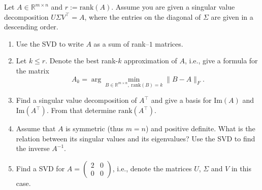  Let $A \in \mathbb{R}^{m \times n}$ and $r:=\text{rank}(A)$. Assume you are given a singular value decomposition 
 $U \Sigma V^\top = A$, where the 
 entries on the diagonal of $\Sigma$ are given in a descending order.
 \begin{enumerate}
 	\item Use the SVD to write $A$ as a sum of rank--$1$ matrices.
 	\item Let $k \leq r$. Denote the best rank-$k$ approximation of $A$, i.e., give a formula for the matrix
 	$$A_k = \arg \min_{B \in  \mathbb{R}^{m \times n},~ \text{rank}(B)=k  } \|B-A\|_F.$$ 
 	\item Find a singular value decomposition of $A^\top$ and give a basis for $\text{Im}(A)$ and $\text{Im}(A^\top)$.	From that determine $\text{rank}(A^\top)$.	
 	\item Assume that $A$ is symmetric (thus $m=n$) and positive definite. What is the relation between its singular values and its eigenvalues? Use the SVD to find the inverse $A^{-1}$.%
 	 \item Find a SVD for $A = \begin{pmatrix}
 	2 & 0\\0&0
 	\end{pmatrix}$, i.e., denote the matrices $U$, $\Sigma$ and $V$ in this case.
 \end{enumerate}